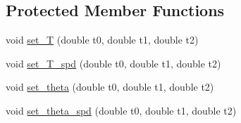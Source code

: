 \subsection*{Protected Member Functions}
\begin{DoxyCompactItemize}
\item 
void \hyperlink{classstp_1_1_model_ade58705e09f3edf93f43a51021517f9e}{set\+\_\+T} (double t0, double t1, double t2)
\item 
void \hyperlink{classstp_1_1_model_a84fd6646ed05db5eec86afd968fde65d}{set\+\_\+\+T\+\_\+spd} (double t0, double t1, double t2)
\item 
void \hyperlink{classstp_1_1_model_a6a6dcae980e86d84084dc4ccd0de3285}{set\+\_\+theta} (double t0, double t1, double t2)
\item 
void \hyperlink{classstp_1_1_model_afd0f76304578013e1faff062a318dac5}{set\+\_\+theta\+\_\+spd} (double t0, double t1, double t2)
\end{DoxyCompactItemize}
